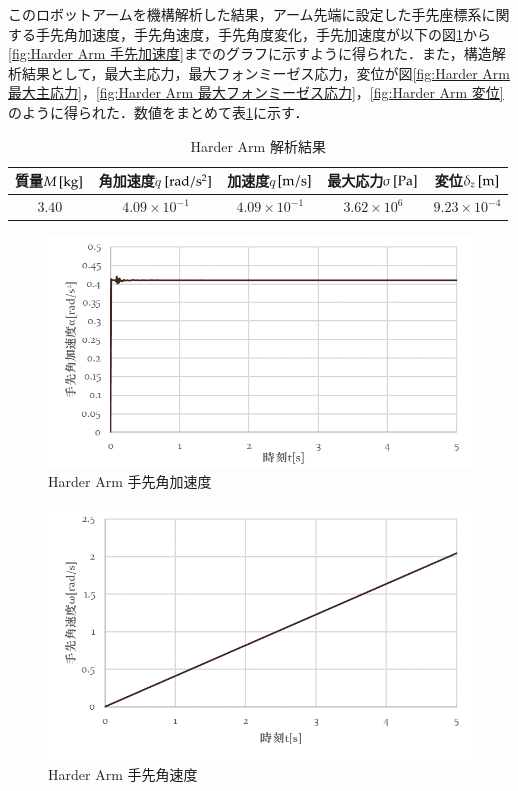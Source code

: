 \documentclass[10pt,b5paper,papersize,dvipdfmx]{jsbook}
\begin{document}
このロボットアームを機構解析した結果，アーム先端に設定した手先座標系に関する手先角加速度，手先角速度，手先角度変化，手先加速度が以下の図\ref{fig:Harder Arm 手先角加速度}から\ref{fig:Harder Arm 手先加速度}までのグラフに示すように得られた．また，構造解析結果として，最大主応力，最大フォンミーゼス応力，変位が図\ref{fig:Harder Arm 最大主応力}，\ref{fig:Harder Arm 最大フォンミーゼス応力}，\ref{fig:Harder Arm 変位} のように得られた．数値をまとめて表\ref{tbl:Harder Arm 解析結果}に示す．
\begin{table}[H]
  \centering
  \caption{Harder Arm 解析結果}
  \label{tbl:Harder Arm 解析結果}
  \begin{tabular}{|c|c|c|c|c|} \hline
    質量$M\tani*{kg}$& 角加速度$\ddot{q}$$\tani*{rad/s^2}$& 加速度$\dot{q}$$\tani*{m/s}$& 最大応力$\sigma\tani*{Pa}$& 変位$\delta_z\tani*{m}$\\ \hline
    $3.40$&$4.09\times 10^{-1}$&$4.09\times 10^{-1}$&$3.62\times 10^6$&$9.23\times 10^{-4}$\\ \hline
  \end{tabular}
\end{table}
%
\begin{figure}[H]
  \centering
  \includegraphics[width=.8\textwidth]{img/robot14.png}
  \caption{Harder Arm 手先角加速度}
  \label{fig:Harder Arm 手先角加速度}
\end{figure}
%
\begin{figure}[H]
  \centering
  \includegraphics[width=.8\textwidth]{img/robot15.png}
  \caption{Harder Arm 手先角速度}
  \label{fig:Harder Arm 手先角速度}
\end{figure}
%
\end{document}

